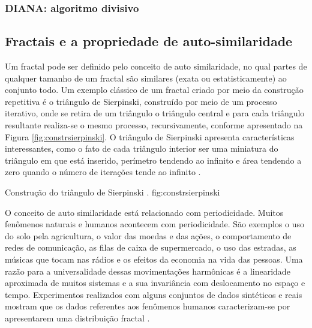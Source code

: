\subsubsection{DIANA: algoritmo divisivo}





\subsection{Fractais e a propriedade de auto-similaridade}
	\label{subsec:fractais}

Um fractal pode ser definido pelo conceito de auto similaridade, no qual partes
de qualquer tamanho de um fractal são similares (exata ou estatisticamente) ao
conjunto todo. Um exemplo clássico de um fractal criado por meio da construção
repetitiva é o triângulo de Sierpinski, construído por meio de um processo
iterativo, onde se retira de um triângulo o triângulo central e para cada
triângulo resultante realiza-se o mesmo processo, recursivamente, conforme
apresentado na Figura \ref{fig:constrsierpinski}. O triângulo de Sierpinski
apresenta características interessantes, como o fato de cada triângulo interior
ser uma miniatura do triângulo em que está inserido, perímetro tendendo ao
infinito e área tendendo a zero quando o número de iterações tende ao infinito
\cite{Schroeder91}. 

{Construção do triângulo de Sierpinski \cite{Schroeder91}.}
{fig:constrsierpinski}

O conceito de auto similaridade está relacionado com periodicidade. Muitos
fenômenos naturais e humanos acontecem com periodicidade. São exemplos o uso do
solo pela agricultura, o valor das moedas e das ações, o comportamento de redes
de comunicação, as filas de caixa de supermercado, o uso das estradas, as
músicas que tocam nas rádios e os efeitos da economia na vida das pessoas. Uma
razão para a universalidade dessas movimentações harmônicas é a linearidade
aproximada de muitos sistemas e a sua invariância com deslocamento no espaço e
tempo. Experimentos realizados com alguns conjuntos de dados sintéticos e reais
mostram que os dados referentes aos fenômenos humanos caracterizam-se por
apresentarem uma distribuição fractal \cite{Traina2010}.

